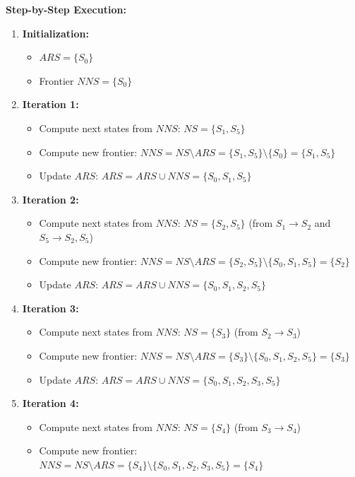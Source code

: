 \documentclass[12pt,a4paper]{article}
\begin{document}
\textbf{Step-by-Step Execution:}
\begin{enumerate}
    \item \textbf{Initialization:}
    \begin{itemize}
        \item $ARS = \{S_0\}$
        \item Frontier $NNS = \{S_0\}$
    \end{itemize}
    \item \textbf{Iteration 1:}
    \begin{itemize}
        \item Compute next states from $NNS$: $NS = \{S_1, S_5\}$
        \item Compute new frontier: $NNS = NS \setminus ARS = \{S_1, S_5\} \setminus \{S_0\} = \{S_1, S_5\}$
        \item Update $ARS$: $ARS = ARS \cup NNS = \{S_0, S_1, S_5\}$
    \end{itemize}
    \item \textbf{Iteration 2:}
    \begin{itemize}
        \item Compute next states from $NNS$: $NS = \{S_2, S_5\}$ (from $S_1 \rightarrow S_2$ and $S_5 \rightarrow S_2, S_5$)
        \item Compute new frontier: $NNS = NS \setminus ARS = \{S_2, S_5\} \setminus \{S_0, S_1, S_5\} = \{S_2\}$
        \item Update $ARS$: $ARS = ARS \cup NNS = \{S_0, S_1, S_2, S_5\}$
    \end{itemize}
    \item \textbf{Iteration 3:}
    \begin{itemize}
        \item Compute next states from $NNS$: $NS = \{S_3\}$ (from $S_2 \rightarrow S_3$)
        \item Compute new frontier: $NNS = NS \setminus ARS = \{S_3\} \setminus \{S_0, S_1, S_2, S_5\} = \{S_3\}$
        \item Update $ARS$: $ARS = ARS \cup NNS = \{S_0, S_1, S_2, S_3, S_5\}$
    \end{itemize}
    \item \textbf{Iteration 4:}
    \begin{itemize}
        \item Compute next states from $NNS$: $NS = \{S_4\}$ (from $S_3 \rightarrow S_4$)
        \item Compute new frontier: $NNS = NS \setminus ARS = \{S_4\} \setminus \{S_0, S_1, S_2, S_3, S_5\} = \{S_4\}$

\end{itemize}
\end{enumerate}
\end{document}
